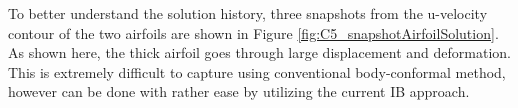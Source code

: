 %
To better understand the solution history, three snapshots from the u-velocity contour of the two airfoils are shown in Figure \ref{fig:C5_snapshotAirfoilSolution}. As shown here, the thick airfoil goes through large displacement and deformation. This is extremely difficult to capture using conventional body-conformal method, however can be done with rather ease by utilizing the current IB approach.
%
\begin{figure}[H]
    \centering
    \quad
    \quad
    \\
    \quad
\end{figure}

